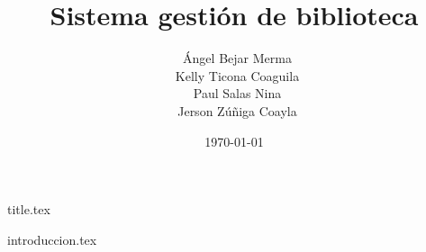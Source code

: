 \documentclass[a4paper,12pt]{article}
\title{Sistema gestión de biblioteca}
\author{\-\ Ángel Bejar Merma\\
        \-\ Kelly Ticona Coaguila\\
        \-\ Paul Salas Nina\\
        \-\ Jerson Zúñiga Coayla}
\date{\today}
\begin{document}
\renewcommand{\listtablename}{Lista de tablas}
\renewcommand{\tablename}{Tabla}
\renewcommand{\listfigurename}{Lista de figuras}
\renewcommand{\figurename}{Figura}

{title.tex}

\tableofcontents
\pagebreak
\listoftables
\pagebreak
\listoffigures
\pagebreak

{introduccion.tex}
\end{document}
